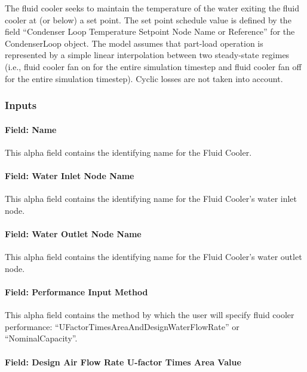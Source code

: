The fluid cooler seeks to maintain the temperature of the water exiting the fluid cooler at (or below) a set point. The set point schedule value is defined by the field ``Condenser Loop Temperature Setpoint Node Name or Reference'' for the CondenserLoop object. The model assumes that part-load operation is represented by a simple linear interpolation between two steady-state regimes (i.e., fluid cooler fan on for the entire simulation timestep and fluid cooler fan off for the entire simulation timestep). Cyclic losses are not taken into account.

\subsubsection{Inputs}\label{inputs-8-003}

\paragraph{Field: Name}\label{field-name-7-003}

This alpha field contains the identifying name for the Fluid Cooler.

\paragraph{Field: Water Inlet Node Name}\label{field-water-inlet-node-name-5}

This alpha field contains the identifying name for the Fluid Cooler's water inlet node.

\paragraph{Field: Water Outlet Node Name}\label{field-water-outlet-node-name-6}

This alpha field contains the identifying name for the Fluid Cooler's water outlet node.

\paragraph{Field: Performance Input Method}\label{field-performance-input-method-5}

This alpha field contains the method by which the user will specify fluid cooler performance: ``UFactorTimesAreaAndDesignWaterFlowRate'' or ``NominalCapacity''.

\paragraph{Field: Design Air Flow Rate U-factor Times Area Value}\label{field-design-air-flow-rate-u-factor-times-area-value-2}

